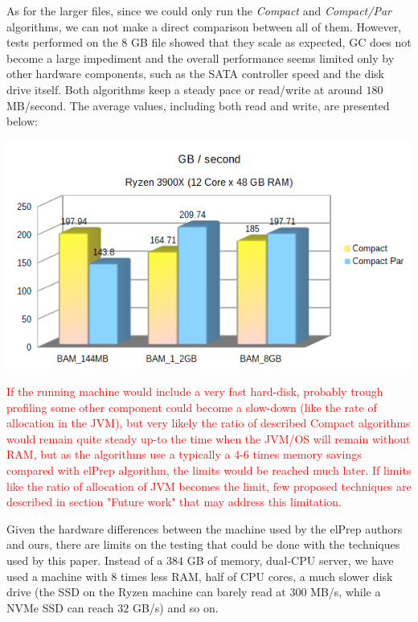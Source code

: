\documentclass[a4paper,twoside]{article}
\begin{document}
As for the larger files, since we could only run the {\it Compact} and {\it Compact/Par} algorithms, we can not make a direct comparison between all of them. However, tests performed on the $8$ GB file showed that they scale as expected, GC does not become a large impediment and the overall performance seems limited only by other hardware components, such as the SATA controller speed and the disk drive itself.
Both algorithms keep a steady pace or read/write at around $180$ MB/second.
The average values, including both read and write, are presented below:

\begin{center}
	\includegraphics[scale=0.5]{images/seconds_per_gb_ryzen.png}
\end{center}


\textcolor{red}{
If the running machine would include a very fast hard-disk, probably trough profiling some other component could become a slow-down (like the rate of allocation in the JVM), but very likely
the ratio of described Compact algorithms would remain quite steady up-to the time when the JVM/OS will remain without RAM, but as the algorithms use a typically a 4-6 times memory 
savings compared with elPrep algorithm, the limits would be reached much later.
If limits like the ratio of allocation of JVM becomes the limit, few proposed techniques are described in section "Future work" that may address this limitation.
}



Given the hardware differences between the machine used by the elPrep authors and ours, there are limits on the testing that could be done with the techniques used by this paper.
Instead of a $384$ GB of memory, dual-CPU server, we have used a machine  with $8$ times less RAM, half of CPU cores, a much slower disk drive (the SSD on the Ryzen machine can barely read at 300 MB/s, while a NVMe SSD can reach $32$ GB/s) and so on.
\end{document}

